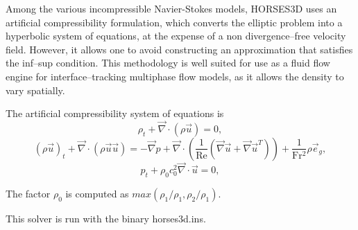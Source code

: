 \documentclass[a4paper,10pt]{report}
\begin{document}
Among the various incompressible Navier-Stokes models, {\selectfont  HORSES3D} uses an artificial compressibility 
formulation, which converts the elliptic problem into a hyperbolic system of equations, at the expense of a non divergence–free 
velocity field. However, it allows one to avoid constructing an approximation that satisfies the inf–sup condition. 
This methodology is well suited for use as a fluid flow engine for interface–tracking multiphase flow models, as it allows the 
density to vary spatially. 

The artificial compressibility system of equations is
%
\begin{equation}
  \rho_{t} + \vec{\nabla}\cdot\left(\rho\vec{u}\right)=0 ,
  \label{eq:incomressible:continuity}
\end{equation}
%
\begin{equation}
\left(\rho\vec{u}\right)_t+\vec{\nabla}\cdot\left(\rho \vec{u}\vec{u}\right) = -\vec{\nabla}p + \vec{\nabla}\cdot\left(\frac{1}{\mathrm{Re}}\left(\vec{\nabla}\vec{u} + 
\vec{\nabla}\vec{u}^{T}\right)\right)+\frac{1}{\mathrm{Fr^{2}}}\rho\vec{e}_{g},
\label{eq:incomressible:momentum}
\end{equation}
%
\begin{equation}
  p_t + \rho_0 c_0^2 \vec{\nabla}\cdot\vec{u} = 0,
  \label{eq:incomressible:ACM}
\end{equation}

The factor $\rho_0$ is computed as $max(\rho_1/\rho_1,\rho_2/\rho_1)$.

This solver is run with the binary horses3d.ins. 
\end{document}
